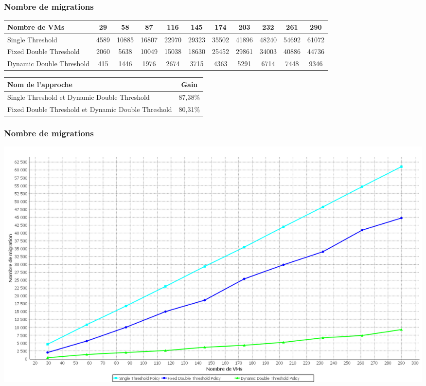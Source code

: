 \documentclass[xcolor=dvipsnames]{beamer}
\begin{document}
\begin{frame}
\frametitle{Nombre de migrations}
\begin{center}
{\tiny  \begin{tabular}{|p{2cm}|c|c|c|c|c|c|c|c|c|c|}
\hline
      \centering     Nombre de VMs &  29& 58& 87& 116& 145& 174& 203& 232& 261& 290\\
\hline
      \centering      Single Threshold &  4589& 10885& 16807& 22970& 29323& 35502& 41896& 48240& 54692& 61072\\
\hline
      \centering      \color{red}Fixed Double Threshold &  2060& 5638& 10049& 15038& 18630& 25452& 29861& 34003& 40886& 44736\\
\hline
      \centering     \color{red}Dynamic Double Threshold &  415& 1446& 1976& 2674& 3715& 4363& 5291& 6714& 7448& 9346\\
\hline
\end{tabular}}
\end{center}



\begin{center}
{\tiny   \begin{tabular}{|p{3.5cm}|c|}
\hline
      \centering      Nom de l’approche &  Gain\\
\hline
      \centering      Single Threshold et Dynamic Double Threshold&  87,38\%\\
\hline
      \centering      Fixed Double Threshold et Dynamic Double Threshold&  80,31\%\\
\hline
\end{tabular}}

\end{center}
\end{frame}

\begin{frame}
\frametitle{Nombre de migrations}
\begin{center}
\includegraphics[scale=0.25]{sh2.png}
\end{center}
\end{frame}
\end{document}

